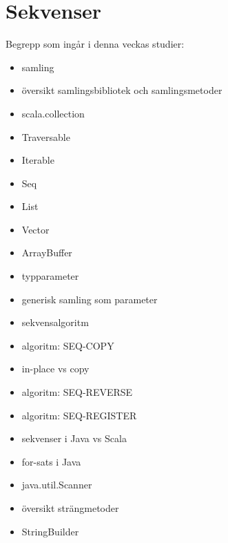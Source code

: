 \chapter{Sekvenser}\label{chapter:W06}
Begrepp som ingår i denna veckas studier:
\begin{itemize}[noitemsep,label={$\square$},leftmargin=*]
\item samling
\item översikt samlingsbibliotek och samlingsmetoder
\item scala.collection
\item Traversable
\item Iterable
\item Seq
\item List
\item Vector
\item ArrayBuffer
\item typparameter
\item generisk samling som parameter
\item sekvensalgoritm
\item algoritm: SEQ-COPY
\item in-place vs copy
\item algoritm: SEQ-REVERSE
\item algoritm: SEQ-REGISTER
\item sekvenser i Java vs Scala
\item for-sats i Java
\item java.util.Scanner
\item översikt strängmetoder
\item StringBuilder\end{itemize}
